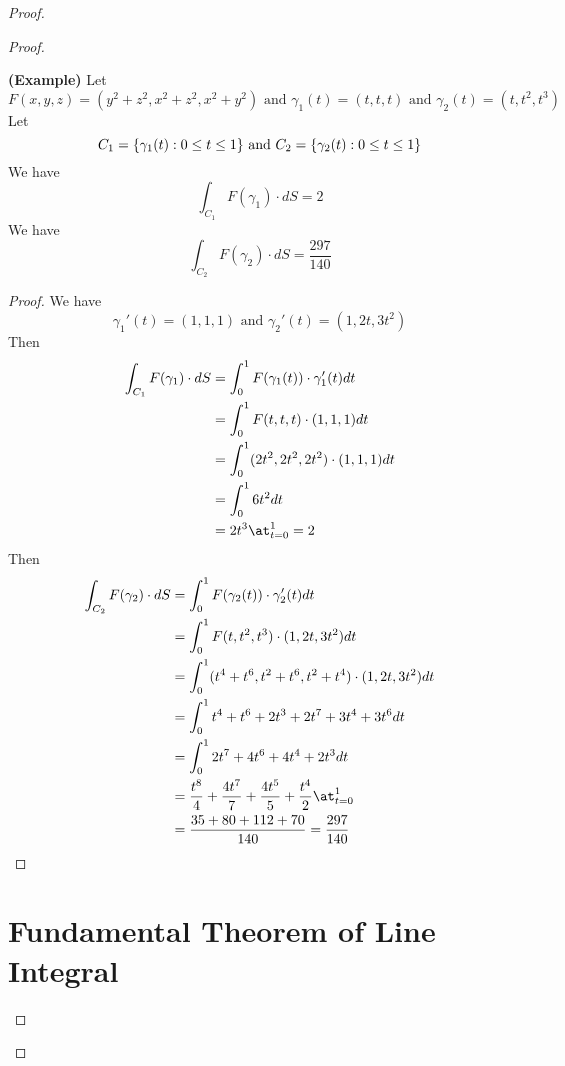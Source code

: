 \documentclass{report}
\begin{document}
\begin{proof}
\begin{proof}
\begin{theorem}
\textbf{(Example)} Let
\begin{equation}
F(x,y,z)=(y^2+z^2,x^2+z^2,x^2+y^2)\text{ and }\gamma_1 (t)=(t,t,t)\text{ and }\gamma _2 (t)=(t,t^2,t^3)
\end{equation}
Let
\begin{equation}
C_1=\{ \gamma _1(t):0\leq t\leq 1 \}\text{ and }C_2=\{ \gamma _2(t):0\leq t\leq 1 \}
\end{equation}
We have
\begin{equation}
\int_{C_1}F(\gamma_1 )\cdot dS=2
\end{equation}
We have
\begin{equation}
\int_{C_2}F(\gamma _2)\cdot dS=\frac{297}{140}
\end{equation}
\end{theorem}
\begin{proof}
We have
\begin{equation}
\gamma _1'(t)=(1,1,1)\text{ and }\gamma _2'(t)=(1,2t,3t^2)
\end{equation}
Then
\begin{align}
\int_{C_1}F(\gamma _1)\cdot dS&=\int_0^1 F(\gamma _1(t))\cdot \gamma _1'(t)dt\\
&=\int_0^1 F(t,t,t)\cdot (1,1,1)dt\\
&=\int_0^1 (2t^2,2t^2,2t^2)\cdot (1,1,1)dt\\
&=\int_0^1 6t^2 dt\\
&=2t^3\at_{t=0}^1=2
\end{align}
Then 
\begin{align}
\int_{C_2}F(\gamma _2)\cdot dS&=\int_0^1 F(\gamma _2(t))\cdot \gamma _2'(t)dt\\
&=\int_0^1 F(t,t^2,t^3)\cdot (1,2t,3t^2)dt\\
&=\int_0^1 (t^4+t^6,t^2+t^6,t^2+t^4)\cdot (1,2t,3t^2)dt\\
&=\int_0^1 t^4+t^6+2t^3+2t^7+3t^4+3t^6dt\\
&=\int_0^1 2t^7+4t^6+4t^4 +2t^3dt\\
&=\frac{t^8}{4}+\frac{4t^7}{7}+\frac{4t^5}{5}+\frac{t^4}{2}\at_{t=0}^1\\
&=\frac{35+80+112+70}{140}=\frac{297}{140}
\end{align}
\end{proof}
\section{Fundamental Theorem of Line Integral}




\end{proof}
\end{proof}
\end{document}

